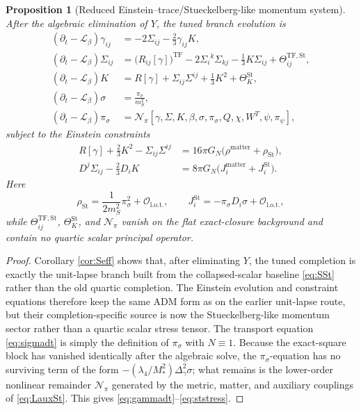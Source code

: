 \documentclass[11pt]{article}
\newcommand{\Ell}{\mathcal{L}}
\newtheorem{proposition}{Proposition}
\begin{document}
\begin{proposition}[Reduced Einstein--trace/Stueckelberg-like momentum system]
\label{prop:reducedsystem}
After the algebraic elimination of \(Y\), the tuned branch evolution is
\begin{align}
(\partial_t-\Ell_\beta)\gamma_{ij}
&=
-2\Sigma_{ij}-\frac23\gamma_{ij}K,
\label{eq:gammadt}
\\
(\partial_t-\Ell_\beta)\Sigma_{ij}
&=
\bigl(R_{ij}[\gamma]\bigr)^{\mathrm{TF}}
-2\Sigma_i{}^k\Sigma_{kj}
-\frac13 K\Sigma_{ij}
+\Theta_{ij}^{\mathrm{TF,St}},
\label{eq:Sigmadt}
\\
(\partial_t-\Ell_\beta)K
&=
R[\gamma]+\Sigma_{ij}\Sigma^{ij}+\frac13K^2+\Theta_K^{\mathrm{St}},
\label{eq:Kdt}
\\
(\partial_t-\Ell_\beta)\sigma
&=
\frac{\pi_\sigma}{m_S^2},
\label{eq:sigmadt}
\\
(\partial_t-\Ell_\beta)\pi_\sigma
&=
\mathcal N_\pi[\gamma,\Sigma,K,\beta,\sigma,\pi_\sigma,Q,\chi,W^T,\psi,\pi_\psi],
\label{eq:pidt}
\end{align}
subject to the Einstein constraints
\begin{align}
R[\gamma]+\frac23K^2-\Sigma_{ij}\Sigma^{ij}
&=
16\pi G_N\bigl(\rho^{\mathrm{matter}}+\rho_{\mathrm{St}}\bigr),
\label{eq:Hconstraint}
\\
D^j\Sigma_{ij}-\frac23D_iK
&=
8\pi G_N\bigl(J_i^{\mathrm{matter}}+J_i^{\mathrm{St}}\bigr).
\label{eq:Mconstraint}
\end{align}
Here
\begin{equation}
\rho_{\mathrm{St}}
=
\frac{1}{2m_S^2}\pi_\sigma^2+\mathcal O_{\mathrm{l.o.t.}},
\qquad
J_i^{\mathrm{St}}
=
-\pi_\sigma D_i\sigma+\mathcal O_{\mathrm{l.o.t.}},
\label{eq:ststress}
\end{equation}
while \(\Theta_{ij}^{\mathrm{TF,St}}\), \(\Theta_K^{\mathrm{St}}\), and \(\mathcal N_\pi\) vanish on the flat exact-closure background and contain no quartic scalar principal operator.
\end{proposition}

\begin{proof}
Corollary \ref{cor:Seff} shows that, after eliminating \(Y\), the tuned completion is exactly the unit-lapse branch built from the collapsed-scalar baseline \eqref{eq:SSt} rather than the old quartic completion. The Einstein evolution and constraint equations therefore keep the same ADM form as on the earlier unit-lapse route, but their completion-specific source is now the Stueckelberg-like momentum sector rather than a quartic scalar stress tensor. The transport equation \eqref{eq:sigmadt} is simply the definition of \(\pi_\sigma\) with \(N\equiv 1\). Because the exact-square block has vanished identically after the algebraic solve, the \(\pi_\sigma\)-equation has no surviving term of the form \(-(\lambda_4/M_*^2)\Delta_\gamma^2\sigma\); what remains is the lower-order nonlinear remainder \(\mathcal N_\pi\) generated by the metric, matter, and auxiliary couplings of \eqref{eq:LauxSt}. This gives \eqref{eq:gammadt}--\eqref{eq:ststress}.
\end{proof}
\end{document}
